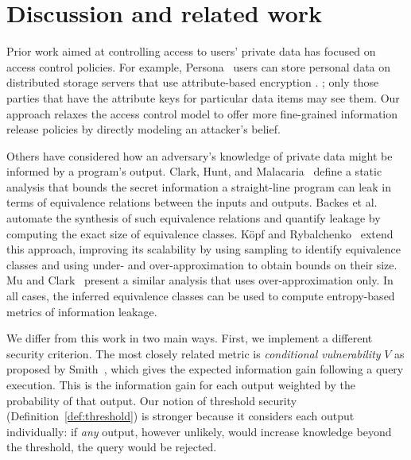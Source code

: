 
\section{Discussion and related work}
\label{sec:related}

Prior work aimed at controlling access to users' private data has
focused on access control policies.  For example,
Persona~\cite{persona} users can store personal data on distributed
storage servers that use attribute-based encryption%
\ifacita
.
\else
; only those
parties that have the attribute keys for particular data items may see
them.
\fi
Our approach relaxes the access control model to offer more
fine-grained information release policies by directly modeling an
attacker's belief.

Others have considered how an adversary's knowledge of private data
might be informed by a program's output.  Clark, Hunt, and
Malacaria~\cite{clark2005QIF} define a static analysis that bounds the
secret information a straight-line program can leak in terms of
equivalence relations between the inputs and outputs.  Backes et
al.~\cite{backes09automatic} automate the synthesis of such
equivalence relations and quantify leakage by computing the exact size
of equivalence classes.  K\"opf and
Rybalchenko~\cite{kopf:rybalchenko} extend this approach, improving
its scalability by using sampling to identify equivalence classes and
using under- and over-approximation to obtain bounds on their size.
Mu and Clark~\cite{Mu:2009:inverval-qif} present a similar analysis
that uses over-approximation only.  In all cases, the inferred
equivalence classes can be used to compute entropy-based metrics of
information leakage.

\ifacita
We differ from this work in two main ways.  First, we implement a
different security criterion.  The most closely related metric is
\emph{conditional vulnerability} $V$ as proposed by Smith~\cite{smith09foundations},
which gives the expected information gain following a query execution.
This is the information gain for each output weighted by the probability of that output.
Our notion of threshold security
(Definition~\ref{def:threshold}) is stronger because it considers each
output individually: if \emph{any} output, however unlikely, would
increase knowledge beyond the threshold, the query would be rejected.

